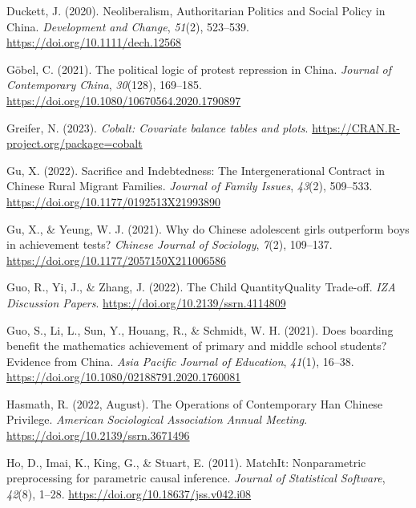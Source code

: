 \documentclass[
  man,floatsintext]{apa7}
\newlength{\cslhangindent}
\newlength{\cslentryspacingunit} %
\newenvironment{CSLReferences}[2] %
 {%
  \setlength{\parindent}{0pt}
  \ifodd #1
  \let\oldpar\par
  \def\par{\hangindent=\cslhangindent\oldpar}
  \fi
  \setlength{\parskip}{#2\cslentryspacingunit}
 }%
 {}
\begin{document}
\begin{CSLReferences}{1}{0}
\leavevmode{}%
Duckett, J. (2020). Neoliberalism, Authoritarian Politics and Social Policy in {China}. \emph{Development and Change}, \emph{51}(2), 523--539. \url{https://doi.org/10.1111/dech.12568}

\leavevmode{}%
Göbel, C. (2021). The political logic of protest repression in {China}. \emph{Journal of Contemporary {China}}, \emph{30}(128), 169--185. \url{https://doi.org/10.1080/10670564.2020.1790897}

\leavevmode{}%
Greifer, N. (2023). \emph{Cobalt: Covariate balance tables and plots}. \url{https://CRAN.R-project.org/package=cobalt}

\leavevmode{}%
Gu, X. (2022). Sacrifice and Indebtedness: The Intergenerational Contract in Chinese Rural Migrant Families. \emph{Journal of Family Issues}, \emph{43}(2), 509--533. \url{https://doi.org/10.1177/0192513X21993890}

\leavevmode{}%
Gu, X., \& Yeung, W. J. (2021). Why do Chinese adolescent girls outperform boys in achievement tests? \emph{Chinese Journal of Sociology}, \emph{7}(2), 109--137. \url{https://doi.org/10.1177/2057150X211006586}

\leavevmode{}%
Guo, R., Yi, J., \& Zhang, J. (2022). The Child Quantity{\textendash}Quality Trade-off. \emph{IZA Discussion Papers}. \url{https://doi.org/10.2139/ssrn.4114809}

\leavevmode{}%
Guo, S., Li, L., Sun, Y., Houang, R., \& Schmidt, W. H. (2021). Does boarding benefit the mathematics achievement of primary and middle school students? Evidence from {China}. \emph{Asia Pacific Journal of Education}, \emph{41}(1), 16--38. \url{https://doi.org/10.1080/02188791.2020.1760081}

\leavevmode{}%
Hasmath, R. (2022, August). The Operations of Contemporary Han Chinese Privilege. \emph{American Sociological Association Annual Meeting}. \url{https://doi.org/10.2139/ssrn.3671496}

\leavevmode{}%
Ho, D., Imai, K., King, G., \& Stuart, E. (2011). {MatchIt}: Nonparametric preprocessing for parametric causal inference. \emph{Journal of Statistical Software}, \emph{42}(8), 1--28. \url{https://doi.org/10.18637/jss.v042.i08}


\end{CSLReferences}
\end{document}
